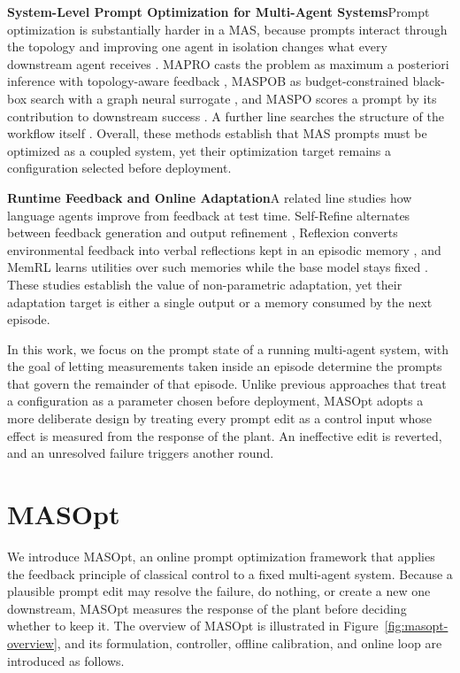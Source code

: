 \documentclass{article}
\theoremstyle{definition}
\begin{document}
\textbf{System-Level Prompt Optimization for Multi-Agent Systems}\quad Prompt optimization is substantially harder in a MAS, because prompts interact through the topology and improving one agent in isolation changes what every downstream agent receives \citep{wu2023autogen,li2023camel}. MAPRO casts the problem as maximum a posteriori inference with topology-aware feedback \citep{mapro2026}, MASPOB as budget-constrained black-box search with a graph neural surrogate \citep{hong2026maspob}, and MASPO scores a prompt by its contribution to downstream success \citep{wang2026maspo}. A further line searches the structure of the workflow itself \citep{zhang2024aflow,xia2025hivemind,zhao2025a2flow}. Overall, these methods establish that MAS prompts must be optimized as a coupled system, yet their optimization target remains a configuration selected before deployment.

\textbf{Runtime Feedback and Online Adaptation}\quad A related line studies how language agents improve from feedback at test time. Self-Refine alternates between feedback generation and output refinement \citep{madaan2023selfrefine,pan2024critic}, Reflexion converts environmental feedback into verbal reflections kept in an episodic memory \citep{shinn2023reflexion,yao2023react}, and MemRL learns utilities over such memories while the base model stays fixed \citep{zhang2026memrl}. These studies establish the value of non-parametric adaptation, yet their adaptation target is either a single output or a memory consumed by the next episode.

In this work, we focus on the prompt state of a running multi-agent system, with the goal of letting measurements taken inside an episode determine the prompts that govern the remainder of that episode. Unlike previous approaches that treat a configuration as a parameter chosen before deployment, MASOpt adopts a more deliberate design by treating every prompt edit as a control input whose effect is measured from the response of the plant. An ineffective edit is reverted, and an unresolved failure triggers another round.

\section{MASOpt}
\label{sec:method}

We introduce MASOpt, an online prompt optimization framework that applies the feedback principle of classical control to a fixed multi-agent system. Because a plausible prompt edit may resolve the failure, do nothing, or create a new one downstream, MASOpt measures the response of the plant before deciding whether to keep it. The overview of MASOpt is illustrated in Figure~\ref{fig:masopt-overview}, and its formulation, controller, offline calibration, and online loop are introduced as follows.
\end{document}
